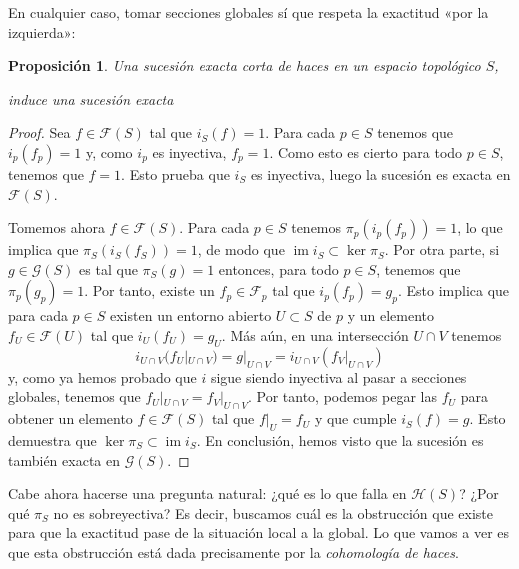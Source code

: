 \documentclass[autocontact]{gaceta}
\newtheorem{prop}[thm]{Proposición}
\theoremstyle{definition} \newtheorem{defn}[thm]{Definición}
\theoremstyle{definition} \newtheorem{ejemplo}[thm]{Ejemplo}
\theoremstyle{definition} \newtheorem{ejercicio}[thm]{Ejercicio}
\def\FF{\mathscr{F}}
\def\GG{\mathscr{G}}
\def\HH{\mathscr{H}}
\DeclareMathOperator{\im}{im}
\begin{document}
    En cualquier caso, tomar secciones globales sí que respeta la exactitud «por la izquierda»:

    \begin{prop}
      Una sucesión exacta corta de haces en un espacio topológico $S$,
      \begin{center}
      \end{center}
      induce una sucesión exacta
      \begin{center}
      \end{center}
    \end{prop}
    \begin{proof}
      Sea $f\in \FF(S)$ tal que $i_S(f)=1$. Para cada $p\in S$ tenemos que $i_p(f_p)=1$ y, como $i_p$ es inyectiva, $f_p=1$. Como esto es cierto para todo $p\in S$, tenemos que $f=1$. Esto prueba que $i_S$ es inyectiva, luego la sucesión es exacta en $\FF(S)$.

      Tomemos ahora $f\in \FF(S)$. Para cada $p \in S$ tenemos $\pi_p(i_p(f_p))=1$, lo que implica que $\pi_S(i_S(f_S))=1$, de modo que $\im i_S \subset \ker \pi_S$. Por otra parte, si $g\in \GG(S)$ es tal que $\pi_S(g)=1$ entonces, para todo $p\in S$, tenemos que $\pi_p(g_p)=1$. Por tanto, existe un $f_p \in \FF_p$ tal que $i_p(f_p)=g_p$. Esto implica que para cada $p\in S$ existen un entorno abierto $U\subset S$ de $p$ y un elemento $f_U\in \FF(U)$ tal que $i_U(f_U)=g_U$. Más aún, en una intersección $U\cap V$ tenemos
      \begin{equation*}
	i_{U\cap V}(f_U|_{U\cap V}) = g|_{U\cap V} = i_{U\cap V}(f_V|_{U\cap V})
      \end{equation*}
      y, como ya hemos probado que $i$ sigue siendo inyectiva al pasar a secciones globales, tenemos que $f_U|_{U\cap V} = f_V|_{U\cap V}$. Por tanto, podemos pegar las $f_U$ para obtener un elemento $f\in \FF(S)$ tal que $f|_U=f_U$ y que cumple $i_S(f)=g$. Esto demuestra que $\ker \pi_S \subset \im i_S$. En conclusión, hemos visto que la sucesión es también exacta en $\GG(S)$.
    \end{proof}

    Cabe ahora hacerse una pregunta natural: ¿qué es lo que falla en $\HH(S)$? ¿Por qué $\pi_S$ no es sobreyectiva? Es decir, buscamos cuál es la obstrucción que existe para que la exactitud pase de la situación local a la global. Lo que vamos a ver es que esta obstrucción está dada precisamente por la \emph{cohomología de haces}.
\end{document}
